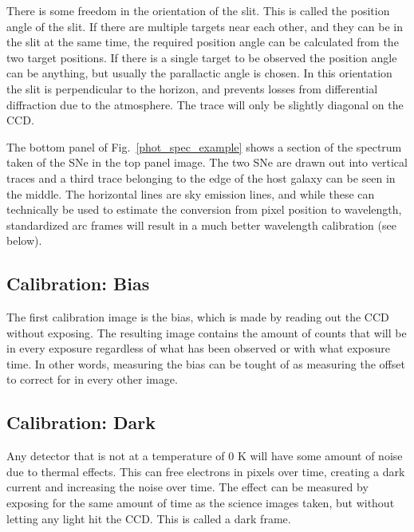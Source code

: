 \documentclass[a4paper,oneside,12pt, class=Latex/Classes/PhDthesisPSnPDF, crop=false]{standalone}
\begin{document}
There is some freedom in the orientation of the slit. This is called the position angle of the slit. If there are multiple targets near each other, and they can be in the slit at the same time, the required position angle can be calculated from the two target positions. If there is a single target to be observed the position angle can be anything, but usually the parallactic angle is chosen. In this orientation the slit is perpendicular to the horizon, and prevents losses from differential diffraction due to the atmosphere. The trace will only be slightly diagonal on the CCD.

The bottom panel of Fig.~\ref{phot_spec_example} shows a section of the spectrum taken of the SNe in the top panel image. The two SNe are drawn out into vertical traces and a third trace belonging to the edge of the host galaxy can be seen in the middle. The horizontal lines are sky emission lines, and while these can technically be used to estimate the conversion from pixel position to wavelength, standardized arc frames will result in a much better wavelength calibration (see below).



\subsection{Calibration: Bias}
The first calibration image is the bias, which is made by reading out the CCD without exposing. The resulting image contains the amount of counts that will be in every exposure regardless of what has been observed or with what exposure time. In other words, measuring the bias can be tought of as measuring the offset to correct for in every other image.


\subsection{Calibration: Dark}
Any detector that is not at a temperature of 0 K will have some amount of noise due to thermal effects. This can free electrons in pixels over time, creating a dark current and increasing the noise over time. The effect can be measured by exposing for the same amount of time as the science images taken, but without letting any light hit the CCD. This is called a dark frame.
\end{document}
